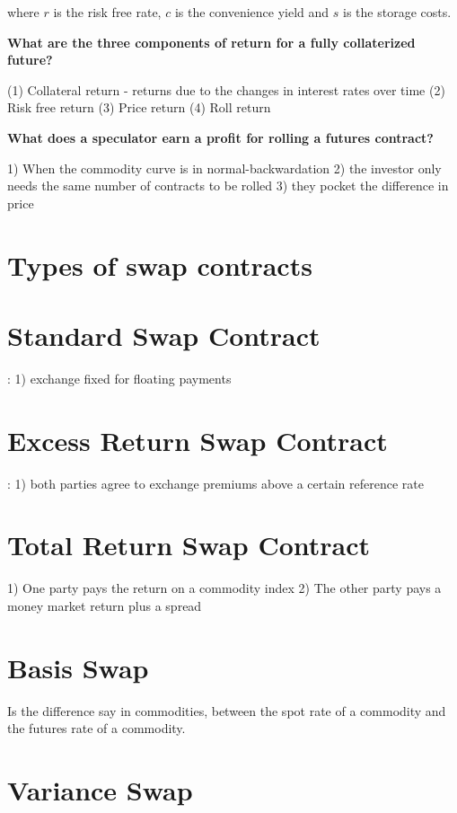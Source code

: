 \documentclass[12pt]{article}
\begin{document}
\begin{framed}
\begin{framed}
	where $r$ is the risk free rate, $c$ is the convenience yield and $s$ is the storage costs.
	
	\textbf{What are the three components of return for a fully collaterized future?}
	
	(1) Collateral return - returns due to the changes in interest rates over time
	(2) Risk free return 
	(3) Price return
	(4) Roll return
	
	\textbf{What does a speculator earn a profit for rolling a futures contract?}
	
	1) When the commodity curve is in normal-backwardation
	2) the investor only needs the same number of contracts to be rolled
	3) they pocket the difference in price
	
	\begin{framed}
		\section{Types of swap contracts}
		
		\section{Standard Swap Contract}: 
		1) exchange fixed for floating payments
		
			\section{Excess Return Swap Contract}: 
		1) both parties agree to exchange premiums above a certain reference rate
		
		\section{Total Return Swap Contract}
		1) One party pays the return on a commodity index
		2) The other party pays a money market return plus a spread
		
		\section{Basis Swap}
		Is the difference say in commodities, between the spot rate of a commodity and the futures rate of a commodity.
		
		\section{Variance Swap}
		
	\end{framed}


\end{framed}
\end{framed}
\end{document}
